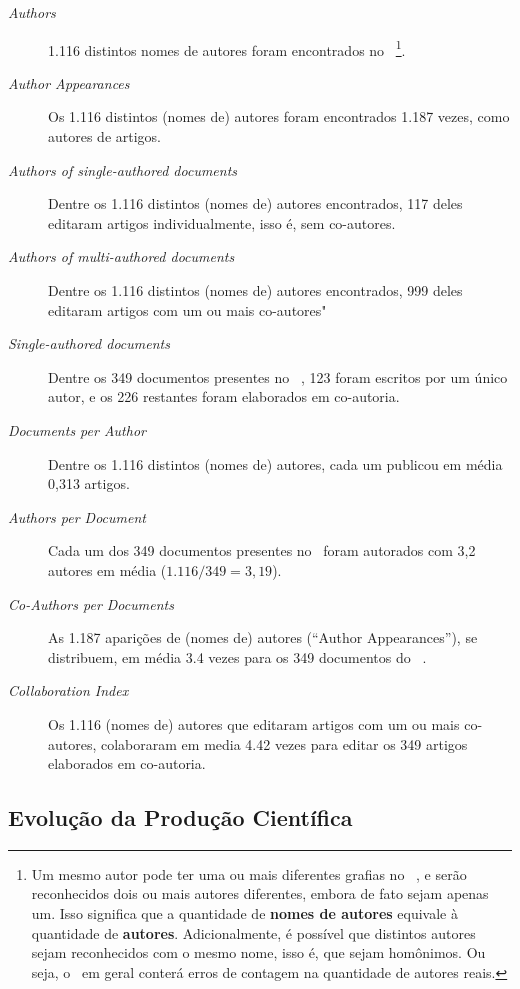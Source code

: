 \begin{description}
    \item [\textit{Authors}] 1.116 distintos nomes de autores foram encontrados no \dataset\  \footnote{Um mesmo autor pode ter uma ou mais diferentes grafias no \dataset\  , e serão reconhecidos dois ou mais autores diferentes, embora de fato sejam apenas um. Isso significa que a quantidade de \textbf{nomes de autores} equivale à quantidade de \textbf{autores}. Adicionalmente, é possível que distintos autores sejam reconhecidos com o mesmo nome, isso é, que sejam homônimos. Ou seja, o \dataset\   em geral conterá erros de contagem na quantidade de autores reais.}.
    \item [\textit{Author Appearances}] Os 1.116 distintos (nomes de) autores foram encontrados 1.187 vezes, como autores de artigos.
    \item [\textit{Authors of single-authored documents}] Dentre os 1.116 distintos (nomes de) autores encontrados, 117 deles editaram artigos individualmente, isso é, sem co-autores.
    \item [\textit{Authors of multi-authored documents}] Dentre os 1.116 distintos (nomes de) autores encontrados, 999 deles editaram artigos com um ou mais co-autores"
    \item [\textit{Single-authored documents}] Dentre os 349 documentos presentes no \dataset\  , 123 foram escritos por um único autor, e os 226 restantes foram elaborados em co-autoria.
    \item [\textit{Documents per Author}] Dentre os 1.116 distintos (nomes de) autores, cada um publicou em média 0,313 artigos.
    \item [\textit{Authors per Document}] Cada um dos 349 documentos presentes no \dataset\  foram autorados com 3,2 autores em média ($1.116 / 349 = 3,19$).
    \item [\textit{Co-Authors per Documents}] As 1.187 aparições de (nomes de) autores (``Author Appearances''), se distribuem, em média 3.4 vezes para os 349 documentos do \dataset\ .
    \item [\textit{Collaboration Index}] Os 1.116 (nomes de) autores que editaram artigos com um ou mais co-autores, colaboraram em media 4.42 vezes para editar os 349 artigos elaborados em co-autoria.
\end{description}

\subsection{Evolução da Produção Científica}

